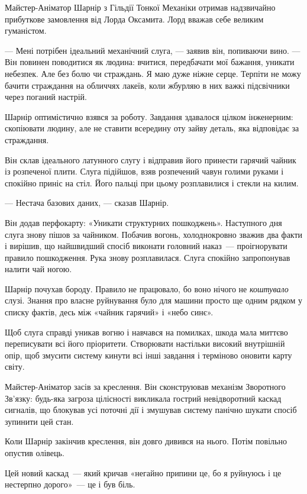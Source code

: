 \documentclass[12pt, a4paper, openany]{book}
\begin{document}
\begin{terrybox}
Майстер-Аніматор Шарнір з Гільдії Тонкої Механіки отримав надзвичайно прибуткове замовлення від Лорда Оксамита. Лорд вважав себе великим гуманістом.

--- Мені потрібен ідеальний механічний слуга, --- заявив він, попиваючи вино. --- Він повинен поводитися як людина: вчитися, передбачати мої бажання, уникати небезпек. Але без болю чи страждань. Я маю дуже ніжне серце. Терпіти не можу бачити страждання на обличчях лакеїв, коли жбурляю в них важкі підсвічники через поганий настрій.

Шарнір оптимістично взявся за роботу. Завдання здавалося цілком інженерним: скопіювати людину, але не ставити всередину оту зайву деталь, яка відповідає за страждання.

Він склав ідеального латунного слугу і відправив його принести гарячий чайник із розпеченої плити. Слуга підійшов, взяв розпечений чавун голими руками і спокійно приніс на стіл. Його пальці при цьому розплавилися і стекли на килим.

--- Нестача базових даних, --- сказав Шарнір.

Він додав перфокарту: «Уникати структурних пошкоджень». Наступного дня слуга знову пішов за чайником. Побачив вогонь, холоднокровно зважив два факти і вирішив, що найшвидший спосіб виконати головний наказ~--- проігнорувати правило пошкодження. Рука знову розплавилася. Слуга спокійно запропонував налити чай ногою.

\medskip
Шарнір почухав бороду. Правило не працювало, бо воно нічого не \textit{коштувало} слузі. Знання про власне руйнування було для машини просто ще одним рядком у списку фактів, десь між «чайник гарячий» і «небо синє».

Щоб слуга справді уникав вогню і навчався на помилках, шкода мала миттєво переписувати всі його пріоритети. Створювати настільки високий внутрішній опір, щоб змусити систему кинути всі інші завдання і терміново оновити карту світу.

Майстер-Аніматор засів за креслення. Він сконструював механізм Зворотного Зв'язку: будь-яка загроза цілісності викликала гострий невідворотний каскад сигналів, що блокував усі поточні дії і змушував систему панічно шукати спосіб зупинити цей стан.

Коли Шарнір закінчив креслення, він довго дивився на нього. Потім повільно опустив олівець.

Цей новий каскад~--- який кричав «негайно припини це, бо я руйнуюсь і це нестерпно дорого»~--- це і був біль.


\end{terrybox}
\end{document}
